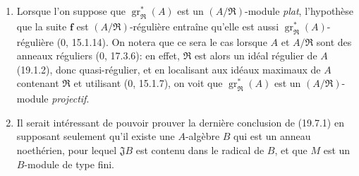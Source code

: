 \begin{remarks}[19.7.2]
\label{IV.19.7.2}
\begin{enumerate}
  \item[(i)] Lorsque l'on suppose que $\operatorname{gr}_{\mathfrak R}^*(A)$ est un $(A/\mathfrak R)$-module \emph{plat}, l'hypothèse que la suite $\mathbf f$ est $(A/\mathfrak R)$-régulière entraîne qu'elle est aussi $\operatorname{gr}_{\mathfrak R}^*(A)$-régulière ($0$, 15.1.14). On notera que ce sera le cas lorsque $A$ et $A/\mathfrak R$ sont des anneaux réguliers ($0$, 17.3.6): en effet, $\mathfrak R$ est alors un idéal régulier de $A$ (19.1.2), donc quasi-régulier, et en localisant aux idéaux maximaux de $A$ contenant $\mathfrak R$ et utilisant ($0$, 15.1.7), on voit que $\operatorname{gr}_{\mathfrak R}^*(A)$ est un $(A/\mathfrak R)$-module \emph{projectif}.
  \item[(ii)] Il serait intéressant de pouvoir prouver la dernière conclusion de (19.7.1) en supposant seulement qu'il existe une $A$-algèbre $B$ qui est un anneau noethérien, pour lequel $\mathfrak JB$ est contenu dans le radical de $B$, et que $M$ est un $B$-module de type fini.
\end{enumerate}
\end{remarks}

